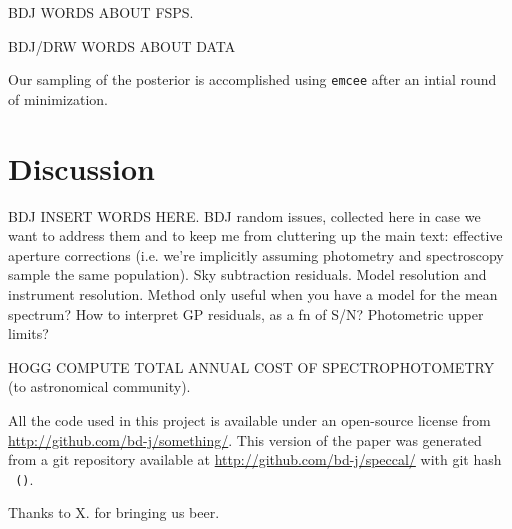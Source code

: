 \documentclass[12pt, letterpaper, preprint]{aastex}
\begin{document}
BDJ WORDS ABOUT FSPS.

BDJ/DRW WORDS ABOUT DATA

Our sampling of the posterior is accomplished using \texttt{emcee}
\cite{dfm} after an intial round of minimization.

\section{Discussion}

BDJ INSERT WORDS HERE.
BDJ random issues, collected here in case we want to address them and
to keep me from cluttering up the main text: effective aperture
corrections (i.e. we're implicitly assuming photometry and
spectroscopy sample the same population).  Sky subtraction residuals.
Model resolution and instrument resolution.  Method only useful when
you have a model for the mean spectrum?  How to interpret GP
residuals, as a fn of S/N?  Photometric upper limits?

HOGG COMPUTE TOTAL ANNUAL COST OF SPECTROPHOTOMETRY (to astronomical community).

All the code used in this project is available under an open-source license
  from \url{http://github.com/bd-j/something/}.
This version of the paper was generated
  from a git repository available at \url{http://github.com/bd-j/speccal/}
  with git hash \texttt{\githash\,(\gitdate)}.

\acknowledgements
Thanks to X. for bringing us beer.
\end{document}
